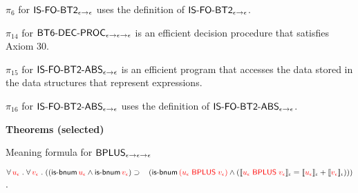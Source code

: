 \documentclass[fleqn]{llncs}
\begin{document}
\begin{biformthy}
    \item $\pi_6$ for $\mbox{\sf IS-FO-BT2}_{\epsilon \rightarrow \epsilon}$
      uses the definition of $\mbox{\sf IS-FO-BT2}_{\epsilon \rightarrow
        \epsilon}$.

    \iffalse

    \item $\pi_{11}$ for $\mname{BT5-DEC-PROC}_{\epsilon \tarrow
      \epsilon \tarrow \epsilon}$ is an efficient decision procedure
      that satisfies Axiom 28.

    \item $\pi_{12}$ for $\mname{IS-FO-BT1-ABS}_{\epsilon \tarrow
      \epsilon}$ is an efficient program that accesses the data stored
      in the data structures that represent expressions.

    \item $\pi_{13}$ for $\mname{IS-FO-BT1-ABS}_{\epsilon \tarrow
      \epsilon}$ uses the definition of
      $\mname{IS-FO-BT1-ABS}_{\epsilon \tarrow \epsilon}$.  

    \fi

    \setcounter{enumi}{13}

    \item $\pi_{14}$ for $\mbox{\sf BT6-DEC-PROC}_{\epsilon \rightarrow
      \epsilon \rightarrow \epsilon}$ is an efficient decision procedure
      that satisfies Axiom 30.

    \item $\pi_{15}$ for $\mbox{\sf IS-FO-BT2-ABS}_{\epsilon \rightarrow
      \epsilon}$ is an efficient program that accesses the data stored
      in the data structures that represent expressions.

    \item $\pi_{16}$ for $\mbox{\sf IS-FO-BT2-ABS}_{\epsilon \rightarrow
      \epsilon}$ uses the definition of
      $\mbox{\sf IS-FO-BT2-ABS}_{\epsilon \rightarrow \epsilon}$.

  \ee

  \item[] \textbf{Theorems (selected)}

    \be

      \setcounter{enumi}{2}

      \item Meaning formula for 
      $\mbox{\sf BPLUS}_{\epsilon \rightarrow \epsilon \rightarrow \epsilon}$

      $\forall\, \textcolor{red}{u_\epsilon} \mathrel. \forall\, \textcolor{red}{v_\epsilon} \mathrel.
      ((\mbox{\sf is-bnum} \, \textcolor{red}{u_\epsilon} \wedge \mbox{\sf is-bnum} \, \textcolor{red}{v_\epsilon}) 
      \supset {}\\
      \hspace*{2ex}(\mbox{\sf is-bnum} \, 
      \textcolor{red}{(u_\epsilon \; \mbox{\sf BPLUS} \; v_\epsilon)} \wedge {}
      (\llbracket\textcolor{red}{u_\epsilon \; \mbox{\sf BPLUS} \; 
      v_\epsilon}\rrbracket_\iota = 
      \llbracket\textcolor{red}{u_\epsilon}\rrbracket_\iota + \llbracket\textcolor{red}{v_\epsilon}\rrbracket_\iota)))$.

    \ee

\ei
\end{biformthy}
\end{document}
